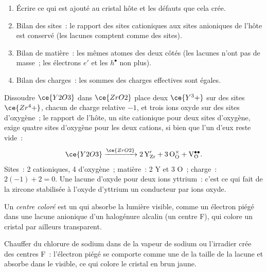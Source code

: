 \begin{method}\label{met:b3:solid-state:kroger-vink}
\begin{enumerate}
  \item Écrire ce qui est ajouté au cristal hôte et les défauts que cela
        crée.
  \item Bilan des sites~: le rapport des sites cationiques aux sites
        anioniques de l'hôte est conservé (les lacunes comptent comme des
        sites).
  \item Bilan de matière~: les mêmes atomes des deux côtés (les lacunes
        n'ont pas de masse~; les électrons $e'$ et les  $h^\bullet$ non plus).
  \item Bilan des charges~: les sommes des charges effectives sont égales.
\end{enumerate}
\end{method}

\begin{example}
Dissoudre $\ce{Y2O3}$ dans $\ce{ZrO2}$ place deux $\ce{Y^3+}$ sur des sites $\ce{Zr^4+}$, chacun de charge relative $-1$, et
trois ions oxyde sur des sites d'oxygène~; le rapport de l'hôte, un site
cationique pour deux sites d'oxygène, exige quatre sites d'oxygène pour les
deux cations, si bien que l'un d'eux reste vide~:
\[
  \ce{Y2O3} \xrightarrow{\ce{ZrO2}} \mathrm{2\,Y_{Zr}' + 3\,O_O^{\times} + V_O^{\bullet\bullet}}.
\]
Sites~: 2 cationiques, 4 d'oxygène~; matière~: 2 Y et 3 O~; charge~: $2(-1) + 2 = 0$. Une lacune
d'oxyde pour deux ions yttrium~: c'est ce qui fait de la zircone stabilisée
à l'oxyde d'yttrium un conducteur par ions oxyde.
\end{example}

\begin{definition}\label{def:b3:solid-state:colour-centre}
Un \emph{centre coloré} est un  qui absorbe
la lumière visible, comme un électron piégé dans une lacune anionique d'un
halogénure alcalin (un centre F), qui colore un cristal par ailleurs
transparent.
\end{definition}

Chauffer du chlorure de sodium dans de la vapeur de sodium ou l'irradier
crée des centres F~: l'électron piégé se comporte comme une  de la taille de la lacune et absorbe dans le visible, ce qui
colore le cristal en brun jaune.

